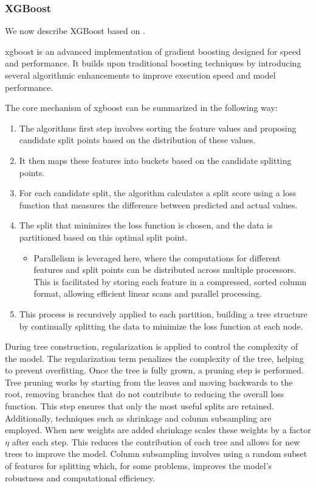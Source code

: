\subsubsection{XGBoost}
We now describe XGBoost based on \citet{ChenGuestrin2016}.

\gls{xgboost} is an advanced implementation of gradient boosting designed for speed and performance. 
It builds upon traditional boosting techniques by introducing several algorithmic enhancements to improve execution speed and model performance.

The core mechanism of \gls{xgboost} can be summarized in the following way:
\begin{enumerate}
\item The algorithms first step involves sorting the feature values and proposing candidate split points based on the distribution of these values.
\item It then maps these features into buckets based on the candidate splitting points.
\item For each candidate split, the algorithm calculates a split score using a loss function that measures the difference between predicted and actual values.
\item The split that minimizes the loss function is chosen, and the data is partitioned based on this optimal split point. 
	\begin{itemize}
		\item Parallelism is leveraged here, where the computations for different features and split points can be distributed across multiple processors. 
		This is facilitated by storing each feature in a compressed, sorted column format, allowing efficient linear scans and parallel processing.
	\end{itemize}
\item This process is recursively applied to each partition, building a tree structure by continually splitting the data to minimize the loss function at each node.
\end{enumerate}
During tree construction, regularization is applied to control the complexity of the model. 
The regularization term penalizes the complexity of the tree, helping to prevent overfitting.
Once the tree is fully grown, a pruning step is performed. 
Tree pruning works by starting from the leaves and moving backwards to the root, removing branches that do not contribute to reducing the overall loss function. 
This step ensures that only the most useful splits are retained.
Additionally, techniques such as shrinkage and column subsampling are employed. 
When new weights are added shrinkage scales these weights by a factor $\eta$ after each step.
This reduces the contribution of each tree and allows for new trees to improve the model.
Column subsampling involves using a random subset of features for splitting which, for some problems, improves the model's robustness and computational efficiency.
